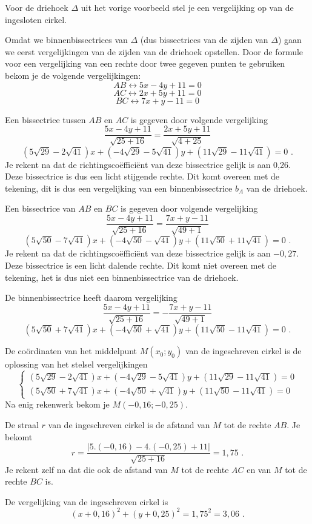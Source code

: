 \begin{voorbeeld}
	Voor de driehoek $\Delta$ uit het vorige voorbeeld stel je een vergelijking op van de ingesloten cirkel.

Omdat we binnenbissectrices van $\Delta$ (dus bissectrices van de zijden van $\Delta$) gaan we eerst vergelijkingen van de zijden van de driehoek opstellen.
Door de formule voor een vergelijking van een rechte door twee gegeven punten te gebruiken bekom je de volgende vergelijkingen:
\[
AB \leftrightarrow 5x-4y+11=0
\]
\[
AC \leftrightarrow 2x+5y+11=0
\]
\[
BC \leftrightarrow 7x+y-11=0
\]

Een bissectrice tussen $AB$ en $AC$ is gegeven door volgende vergelijking
\[
\frac {5x-4y+11}{\sqrt {25+16}}=\frac {2x+5y+11}{\sqrt {4+25}}
\]
\[
(5\sqrt {29}-2\sqrt{41})x+(-4\sqrt{29}-5\sqrt{41})y+(11\sqrt{29}-11\sqrt{41})=0 \text { .}
\]
Je rekent na dat de richtingsco\"effici\"ent van deze bissectrice gelijk is aan 0,26.
Deze bissectrice is dus een licht stijgende rechte.
Dit komt overeen met de tekening, dit is dus een vergelijking van een binnenbissectrice $b_A$ van de driehoek.

Een bissectrice van $AB$ en $BC$ is gegeven door volgende vergelijking
\[
\frac {5x-4y+11}{\sqrt {25+16}}=\frac {7x+y-11}{\sqrt {49+1}}
\]
\[
(5\sqrt {50}-7\sqrt {41})x+(-4\sqrt {50}-\sqrt {41})y+(11 \sqrt{50}+11\sqrt {41})=0 \text { .}
\]
Je rekent na dat de richtingsco\"effici\"ent van deze bissectrice gelijk is aan $-0,27$.
Deze bissectrice is een licht dalende rechte.
Dit komt niet overeen met de tekening, het is dus niet een binnenbissectrice van de driehoek.

De binnenbissectrice heeft daarom vergelijking
\[
\frac {5x-4y+11}{\sqrt {25+16}}=-\frac {7x+y-11}{\sqrt {49+1}}
\]
\[
(5\sqrt {50}+7\sqrt {41})x+(-4\sqrt {50}+\sqrt {41})y+(11 \sqrt{50}-11\sqrt {41})=0 \text { .}
\]

De co\"ordinaten van het middelpunt $M(x_0;y_0)$ van de ingeschreven cirkel is de oplossing van het stelsel vergelijkingen
\[
\begin{cases}
(5\sqrt {29}-2\sqrt{41})x+(-4\sqrt{29}-5\sqrt{41})y+(11\sqrt{29}-11\sqrt{41})=0 \\
(5\sqrt {50}+7\sqrt {41})x+(-4\sqrt {50}+\sqrt {41})y+(11 \sqrt{50}-11\sqrt {41})=0
\end{cases}
\]
Na enig rekenwerk bekom je $M(-0,16;-0,25)$.

De straal $r$ van de ingeschreven cirkel is de afstand van $M$ tot de rechte $AB$.
Je bekomt
\[
r=\frac {\vert 5.(-0,16)-4.(-0,25)+11 \vert }{\sqrt {25+16}}=1,75 \text { .}
\]
Je rekent zelf na dat die ook de afstand van $M$ tot de rechte $AC$ en van $M$ tot de rechte $BC$ is.

De vergelijking van de ingeschreven cirkel is
\[
(x+0,16)^2+(y+0,25)^2=1,75^2=3,06 \text { .}
\]

\end{voorbeeld}